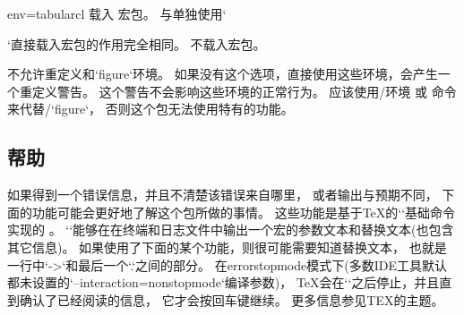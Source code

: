 \begin{tableobject}{env=tabular}{cl}
 载入 宏包。
  与单独使用`\usepackage{longtable}`直接载入宏包的作用完全相同。
 不载入宏包。

 不允许重定义和`figure`环境。
  如果没有这个选项，直接使用这些环境，会产生一个重定义警告。
  这个警告不会影响这些环境的正常行为。
  应该使用\slash {}环境 或 命令
  来代替\slash `figure`，
  否则这个包无法使用特有的功能。
\endpkgoptndoc


\subsection{帮助}
\label{help}

如果得到一个错误信息，并且不清楚该错误来自哪里，
或者输出与预期不同，
下面的功能可能会更好地了解这个包所做的事情。
这些功能是基于\TeX{}的`\show`基础命令实现的 。
\DescribeMacro{\show}
`\show`能够在在终端和日志文件中输出一个宏的参数文本和替换文本(也包含其它信息)。
如果使用了下面的某个功能，则很可能需要知道替换文本，
也就是一行中`->`和最后一个`.`之间的部分。
在errorstopmode模式下(多数IDE工具默认都未设置的`--interaction=nonstopmode`编译参数)，
\TeX{}会在`\show`之后停止，并且直到确认了已经阅读的信息，
它才会按回车键继续。
更多信息参见TEX的主题。


\end{tableobject}

